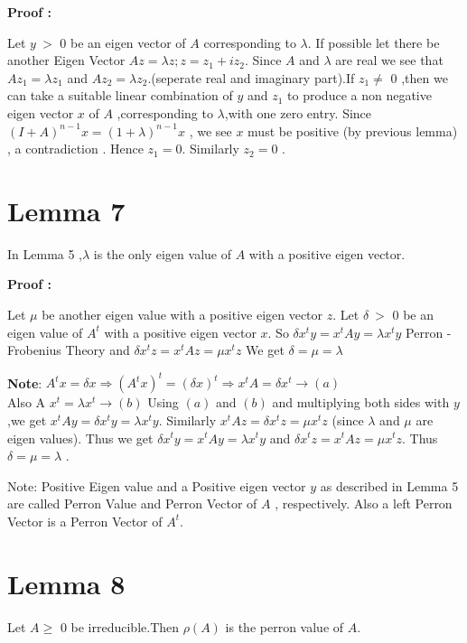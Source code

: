 {\bf Proof :}

Let $ y \ > $ 0 be an eigen vector of $A$ corresponding to $\lambda $.
If possible let there be another Eigen Vector $Az =\lambda z ;z =z_{1}+ i z_{2}$.
Since $A$ and $\lambda $ are real we see that $Az_{1} =\lambda z_{1}$ and $Az_{2} =\lambda z_{2}$.(seperate real and imaginary 
part).If $z_{1}\neq$ 0 ,then we can take a suitable linear combination of $y$ and $z_{1}$ to produce a non negative eigen
vector $x$ of $A$ ,corresponding to $\lambda $,with one zero entry.
Since $(I+A)^{n-1}x = (1+\lambda )^{n-1}x$ , we see $x$ must be positive (by previous lemma) , a contradiction .
Hence $z_{1} = 0 $. Similarly $z_{2} = 0 $ .

\section{Lemma 7}
In Lemma 5 ,$\lambda $ is the only eigen value of $A$ with a positive eigen vector.

{\bf Proof : }

Let $\mu$ be another eigen value with a positive eigen vector $z$.
Let $\delta \ > $ 0 be an eigen value of $A^{t}$ with a positive eigen vector $x$.
So $\delta x^{t} y =x^{t} A y =\lambda x^{t} y $ Perron - Frobenius Theory  and $\delta x^{t} z =x^{t} A z = \mu x^{t} z$
We get $\delta = \mu=\lambda $

{\bf Note}: $A^{t} x=\delta  x 
\Longrightarrow  (A^{t} x)^{t} = (\delta x)^{t}
\Longrightarrow  x^{t} A  = \delta x^{t}                \longrightarrow (a)$
\\Also A $x^{t} = \lambda x^{t}                           \longrightarrow (b)$
Using $(a)$ and $(b)$ and multiplying both sides with $y$ ,we get  $x^{t} A y  = \delta x^{t} y =\lambda x^{t}  y$.
Similarly   $x^{t}  A z  = \delta x^{t} z  = \mu x^{t} z $ (since $\lambda $ and $\mu$ are eigen values).
Thus we get $\delta x^{t} y = x^{t} A y = \lambda x^{t} y $ and $\delta x^{t} z  = x^{t} A z =\mu x^{t}z$.
Thus  $\delta =\mu=\lambda $ .
  
Note:
Positive Eigen value and a Positive eigen vector $y$ as described in Lemma 5 are called Perron Value and Perron Vector of $A$ ,
respectively. Also a left Perron Vector is a Perron Vector of $A^{t}$.
  
  
\section{Lemma 8}
Let $A \geq $ 0 be irreducible.Then $\rho(A)$ is the perron value of $A$. 

